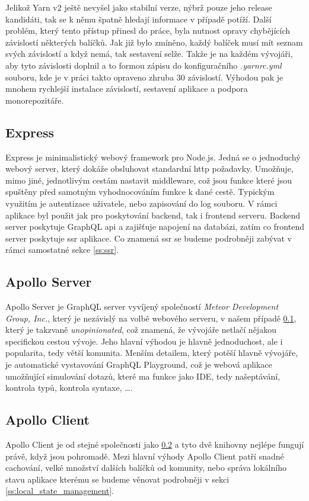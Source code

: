 Jelikož Yarn v2 ještě nevyšel jako stabilní verze, nýbrž pouze jeho release kandidáti, tak se k němu špatně hledají informace v případě potíží. Další problém, který tento přístup přinesl do práce, byla nutnost opravy chybějících závislostí některých balíčků. Jak již bylo zmíněno, každý balíček musí mít seznam svých závislostí a když nemá, tak sestavení selže. Takže je na každém vývojáři, aby tyto závislosti doplnil a to formou zápisu do konfiguračního \emph{.yarnrc.yml} souboru, kde je v práci takto opraveno zhruba 30 závislostí. Výhodou pak je mnohem rychlejší instalace závislostí, sestavení aplikace a podpora monorepozitáře.

\subsection{Express}
\label{ss:express}
Express je minimalistický webový framework pro Node.js. Jedná se o jednoduchý webový server, který dokáže obsluhovat standardní http požadavky. Umožňuje, mimo jiné, jednotlivým cestám nastavit middleware, což jsou funkce které jsou spuštěny před samotným vyhodnocováním funkce k dané cestě. Typickým využitím je autentizace uživatele, nebo zapisování do log souboru. V rámci aplikace byl použit jak pro poskytování backend, tak i frontend serveru. Backend server poskytuje GraphQL \acrshort{api} a zajišťuje napojení na databázi, zatím co frontend server poskytuje \acrfull{ssr} aplikace. Co znamená \acrfull{ssr} se budeme podrobněji zabývat v rámci samostatné sekce \ref{ss:ssr}.

\subsection{Apollo Server}
\label{ss:apollo_server}
Apollo Server je GraphQL server vyvíjený společností \emph{Meteor Development Group, Inc.}, který je nezávislý na volbě webového serveru, v našem případě \ref{ss:express}, který je takzvaně \emph{unopinionated}, což znamená, že vývojáře netlačí nějakou specifickou cestou vývoje. Jeho hlavní výhodou je hlavně jednoduchost, ale i popularita, tedy větší komunita. Menším detailem, který potěší hlavně vývojáře, je automatické vystavování GraphQL Playground, což je webová aplikace umožňující simulování dotazů, které ma funkce jako IDE, tedy našeptávání, kontrola typů, kontrola syntaxe, \ldots{}.

\subsection{Apollo Client}
\label{ss:apollo_client}
Apollo Client je od stejné společnosti jako \ref{ss:apollo_server} a tyto dvě knihovny nejlépe fungují právě, když jsou pohromadě. Mezi hlavní výhody Apollo Client patří snadné cachování, velké množství dalších balíčků od komunity, nebo správa lokálního stavu aplikace kterému se budeme věnovat podrobněji v sekci \ref{ss:local_state_management}.

